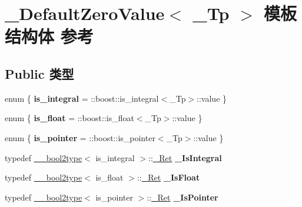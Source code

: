 \hypertarget{struct___default_zero_value}{}\section{\+\_\+\+Default\+Zero\+Value$<$ \+\_\+\+Tp $>$ 模板结构体 参考}
\label{struct___default_zero_value}
\subsection*{Public 类型}
\begin{DoxyCompactItemize}
\item 
\mbox{\label{struct___default_zero_value_a608c889ed6ac47886d3896482ccefe5e}} 
enum \{ {\bfseries is\+\_\+integral} = \+:\+:boost\+:\+:is\+\_\+integral$<$\+\_\+\+Tp$>$\+:\+:value
 \}
\item 
\mbox{\label{struct___default_zero_value_a65311e8664444d7e9ce8b631e3c092ed}} 
enum \{ {\bfseries is\+\_\+float} = \+:\+:boost\+:\+:is\+\_\+float$<$\+\_\+\+Tp$>$\+:\+:value
 \}
\item 
\mbox{\label{struct___default_zero_value_a038ec5afb60ccc79277fca1067b7a113}} 
enum \{ {\bfseries is\+\_\+pointer} = \+:\+:boost\+:\+:is\+\_\+pointer$<$\+\_\+\+Tp$>$\+:\+:value
 \}
\item 
\mbox{\label{struct___default_zero_value_aaf8ed349367e850d9e1383aa50fe642a}} 
typedef \hyperlink{struct____bool2type}{\+\_\+\+\_\+bool2type}$<$ is\+\_\+integral $>$\+::\hyperlink{struct____true__type}{\+\_\+\+Ret} {\bfseries \+\_\+\+Is\+Integral}
\item 
\mbox{\label{struct___default_zero_value_a275053be6514a2110ccfc8a46e548bf2}} 
typedef \hyperlink{struct____bool2type}{\+\_\+\+\_\+bool2type}$<$ is\+\_\+float $>$\+::\hyperlink{struct____true__type}{\+\_\+\+Ret} {\bfseries \+\_\+\+Is\+Float}
\item 
\mbox{\label{struct___default_zero_value_a52b5b1f5c13e9115279acb2998bc64cd}} 
typedef \hyperlink{struct____bool2type}{\+\_\+\+\_\+bool2type}$<$ is\+\_\+pointer $>$\+::\hyperlink{struct____true__type}{\+\_\+\+Ret} {\bfseries \+\_\+\+Is\+Pointer}

\end{DoxyCompactItemize}
